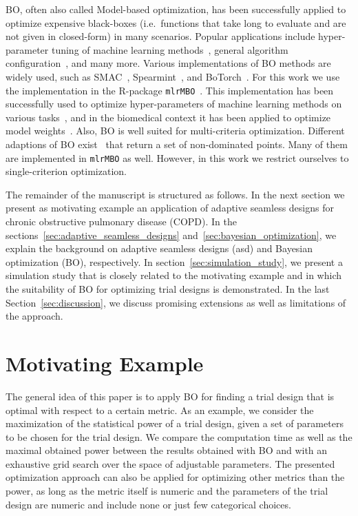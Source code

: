 \documentclass[bimj,fleqn]{w-art}
\theoremstyle{plain}
\theoremstyle{definition}
\begin{document}
BO, often also called Model-based optimization, has been successfully applied to optimize expensive black-boxes (i.e.\ functions that take long to evaluate and are not given in closed-form) in many scenarios.
Popular applications include hyper-parameter tuning of machine learning methods~\citep{snoek_practical_2012}, general algorithm configuration~\citep{hutter_sequential_2011}, and many more.
Various implementations of BO methods are widely used, such as SMAC~\citep{hutter_sequential_2011}, Spearmint~\citep{snoek_practical_2012}, and BoTorch~\citep{balandat_botorch_2020}.
For this work we use the implementation in the R-package \texttt{mlrMBO}~\citep{bischl_mlrmbo_2017}.
This implementation has been successfully used to optimize hyper-parameters of machine learning methods on various tasks~\citep{bischl_mlrmbo_2017, wozniak_candle_2018}, and in the biomedical context it has been applied to optimize model weights~\citep{richter_modelbased_2019,browaeys_nichenet_2020}.
Also, BO is well suited for multi-criteria optimization.
Different adaptions of BO exist~\citep{horn_modelbased_2015} that return a set of non-dominated points.
Many of them are implemented in \texttt{mlrMBO} as well.
However, in this work we restrict ourselves to single-criterion optimization. 

The remainder of the manuscript is structured as follows.
In the next section we present as motivating example an application of adaptive seamless designs for chronic obstructive pulmonary disease (COPD).
In the sections~\ref{sec:adaptive_seamless_designs} and~\ref{sec:bayesian_optimization}, we explain the background on adaptive seamless designs (asd) and Bayesian optimization (BO), respectively.
In section~\ref{sec:simulation_study}, we present a simulation study that is closely related to the motivating example and in which the suitability of BO for optimizing trial designs is demonstrated.
In the last Section~\ref{sec:discussion}, we discuss promising extensions as well as limitations of the approach.

\section{Motivating Example}
\label{sec:motivating_example}

The general idea of this paper is to apply BO for finding a trial design that is optimal with respect to a certain metric.
As an example, we consider the maximization of the statistical power of a trial design, given a set of parameters to be chosen for the trial design.
We compare the computation time as well as the maximal obtained power between the results obtained with BO and with an exhaustive grid search over the space of adjustable parameters.
The presented optimization approach can also be applied for optimizing other metrics than the power, as long as the metric itself is numeric and the parameters of the trial design are numeric and include none or just few categorical choices.
\end{document}
